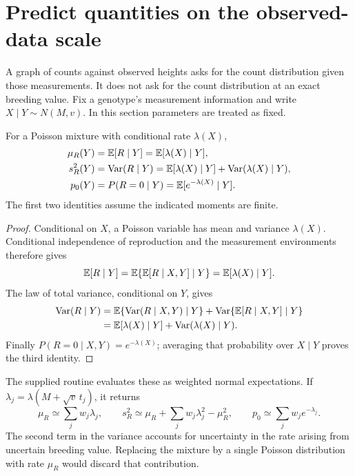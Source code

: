 \section{Predict quantities on the observed-data scale}
\label{estimation:predictions}

A graph of counts against observed heights asks for the count distribution
given those measurements. It does not ask for the count distribution at an
exact breeding value. Fix a genotype's measurement information and write
\(X\mid Y\sim N(M,v)\). In this section parameters are treated as fixed.

\begin{proposition}
\label{estimation:predictive_moments}
For a Poisson mixture with conditional rate \(\lambda(X)\),
\begin{align}
 \mu_R(Y)&=\mathbb E[R\mid Y]=\mathbb E[\lambda(X)\mid Y],\nonumber\\
 s_R^2(Y)&=\operatorname{Var}(R\mid Y)
   =\mathbb E[\lambda(X)\mid Y]+\operatorname{Var}(\lambda(X)\mid Y),\nonumber\\
 p_0(Y)&=P(R=0\mid Y)=\mathbb E[e^{-\lambda(X)}\mid Y].
 \label{estimation:predictive_formula}
\end{align}
The first two identities assume the indicated moments are finite.
\end{proposition}

\begin{proof}
Conditional on \(X\), a Poisson variable has mean and variance \(\lambda(X)\).
Conditional independence of reproduction and the measurement environments
therefore gives
\[
 \mathbb E[R\mid Y]=\mathbb E\{\mathbb E[R\mid X,Y]\mid Y\}
           =\mathbb E[\lambda(X)\mid Y].
\]
The law of total variance, conditional on \(Y\), gives
\begin{align*}
 \operatorname{Var}(R\mid Y)
 &=\mathbb E\{\operatorname{Var}(R\mid X,Y)\mid Y\}
   +\operatorname{Var}\{\mathbb E[R\mid X,Y]\mid Y\}\\
 &=\mathbb E[\lambda(X)\mid Y]+\operatorname{Var}(\lambda(X)\mid Y).
\end{align*}
Finally \(P(R=0\mid X,Y)=e^{-\lambda(X)}\); averaging that probability over
\(X\mid Y\) proves the third identity.
\end{proof}

The supplied routine evaluates these as weighted normal expectations. If
\(\lambda_j=\lambda(M+\sqrt v\,t_j)\), it returns
\[
 \mu_R\simeq\sum_jw_j\lambda_j,\qquad
 s_R^2\simeq\mu_R+\sum_jw_j\lambda_j^2-\mu_R^2,\qquad
 p_0\simeq\sum_jw_je^{-\lambda_j}.
\]
The second term in the variance accounts for uncertainty in the rate arising
from uncertain breeding value. Replacing the mixture by a single Poisson
distribution with rate \(\mu_R\) would discard that contribution.

